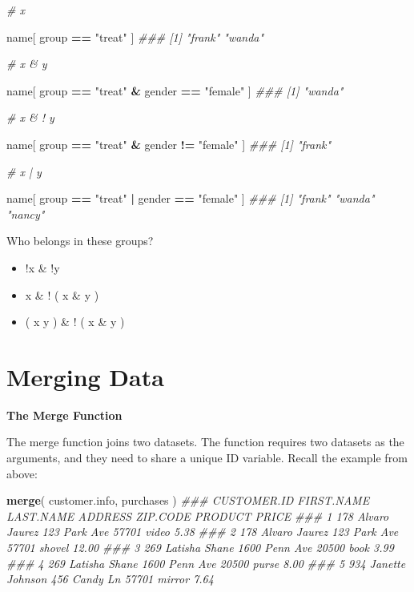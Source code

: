 \documentclass[]{book}
\newenvironment{Shaded}{\begin{snugshade}}{\end{snugshade}}
\newcommand{\CommentTok}[1]{\textcolor[rgb]{0.56,0.35,0.01}{\textit{#1}}}
\newcommand{\KeywordTok}[1]{\textcolor[rgb]{0.13,0.29,0.53}{\textbf{#1}}}
\newcommand{\NormalTok}[1]{#1}
\newcommand{\OperatorTok}[1]{\textcolor[rgb]{0.81,0.36,0.00}{\textbf{#1}}}
\newcommand{\StringTok}[1]{\textcolor[rgb]{0.31,0.60,0.02}{#1}}
\providecommand{\tightlist}{%
  \setlength{\itemsep}{0pt}\setlength{\parskip}{0pt}}
\theoremstyle{definition}
\theoremstyle{definition}
\theoremstyle{definition}
\theoremstyle{remark}
\begin{document}
\begin{Shaded}
\begin{Highlighting}[]
\CommentTok{#   x}

\NormalTok{name[ group }\OperatorTok{==}\StringTok{ "treat"}\NormalTok{ ]}
\CommentTok{### [1] "frank" "wanda"}

\CommentTok{#   x & y}

\NormalTok{name[ group }\OperatorTok{==}\StringTok{ "treat"} \OperatorTok{&}\StringTok{ }\NormalTok{gender }\OperatorTok{==}\StringTok{ "female"}\NormalTok{ ]}
\CommentTok{### [1] "wanda"}

\CommentTok{#   x & ! y}

\NormalTok{name[ group }\OperatorTok{==}\StringTok{ "treat"} \OperatorTok{&}\StringTok{ }\NormalTok{gender }\OperatorTok{!=}\StringTok{ "female"}\NormalTok{ ]}
\CommentTok{### [1] "frank"}

\CommentTok{#  x | y}

\NormalTok{name[ group }\OperatorTok{==}\StringTok{ "treat"} \OperatorTok{|}\StringTok{ }\NormalTok{gender }\OperatorTok{==}\StringTok{ "female"}\NormalTok{ ]}
\CommentTok{### [1] "frank" "wanda" "nancy"}
\end{Highlighting}
\end{Shaded}

Who belongs in these groups?

\begin{itemize}
\tightlist
\item
  !x \& !y
\item
  x \& ! ( x \& y )
\item
  ( x \textbar{} y ) \& ! ( x \& y )
\end{itemize}

\hypertarget{merging-data-1}{%
\section{Merging Data}\label{merging-data-1}}

\textbf{The Merge Function}

The merge function joins two datasets. The function requires two
datasets as the arguments, and they need to share a unique ID variable.
Recall the example from above:

\begin{Shaded}
\begin{Highlighting}[]
\KeywordTok{merge}\NormalTok{( customer.info, purchases )}
\CommentTok{###   CUSTOMER.ID FIRST.NAME LAST.NAME       ADDRESS ZIP.CODE PRODUCT PRICE}
\CommentTok{### 1         178     Alvaro    Jaurez  123 Park Ave    57701   video  5.38}
\CommentTok{### 2         178     Alvaro    Jaurez  123 Park Ave    57701  shovel 12.00}
\CommentTok{### 3         269    Latisha     Shane 1600 Penn Ave    20500    book  3.99}
\CommentTok{### 4         269    Latisha     Shane 1600 Penn Ave    20500   purse  8.00}
\CommentTok{### 5         934    Janette   Johnson  456 Candy Ln    57701  mirror  7.64}
\end{Highlighting}
\end{Shaded}
\end{document}
